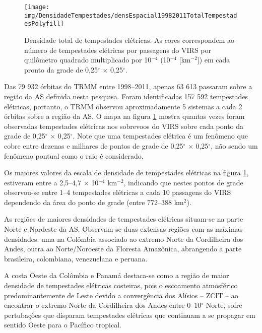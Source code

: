 \begin{figure}[!hb]
 \centering
 {\texttt{[image: img/DensidadeTempestades/densEspacial19982011TotalTempestadesPolyfill]}}
\caption{Densidade total de tempestades elétricas. As cores correspondem ao número de tempestades elétricas por passagens do VIRS por quilômetro quadrado multiplicado por 10$^{-4}$ (10$^{-4}$ [km$^{-2}$]) em cada pronto da grade de 0,25$^{\circ}$ $\times$ 0,25$^{\circ}$. }
 \label{densidadeTempestade}
\end{figure}


Das {79 932} órbitas do TRMM entre 1998--2011, apenas {63 613} passaram sobre a região da AS definida nesta pesquisa. Foram identificadas {157 592} tempestades elétricas, portanto, o TRMM observou aproximadamente 5 sistemas a cada 2 órbitas sobre a região da AS. O mapa na figura \ref{densidadeTempestade} mostra quantas vezes foram observadas tempestades elétricas nos sobrevoos do VIRS sobre cada ponto da grade de 0,25$^{\circ}$ $\times$ 0,25$^{\circ}$. Note que uma tempestades elétrica é um fenômeno que cobre entre dezenas e milhares de pontos de grade de 0,25$^{\circ}$ $\times$ 0,25$^{\circ}$, não sendo um fenômeno pontual como o raio é considerado.

Os maiores valores da escala de densidade de tempestades elétricas na figura \ref{densidadeTempestade}, estiveram entre a 2,5--4,7 $\times$ 10$^{-4}$ km$^{-2}$, indicando que nestes pontos de grade observou-se entre 1--4 tempestades elétricas a cada 10 passagens do VIRS dependendo da área do ponto de grade (entre 772--388 km$^2$).  

As regiões de maiores densidades de tempestades elétricas situam-se na parte Norte e Nordeste da AS. Observam-se duas extensas regiões com as máximas densidades: uma na Colômbia associado ao extremo Norte da Cordilheira dos Andes, outra ao Norte/Noroeste da Floresta Amazônica, abrangendo a parte brasileira, colombiana, venezuelana e peruana.  

A costa Oeste da Colômbia e Panamá destaca-se como a região de maior densidade de tempestades elétricas costeiras, pois o escoamento atmosférico predominantemente de Leste devido a convergência dos Alísios -- ZCIT -- ao encontrar o extremo Norte da Cordilheira dos Andes entre 0--10$^{\circ}$ Norte, sofre pertubações que disparam tempestades elétricas que continuam a se propagar em sentido Oeste para o Pacífico tropical.  

